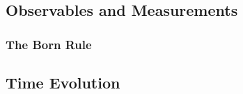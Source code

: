 


\subsection{Observables and Measurements}


\subsubsection{The Born Rule}

















\subsection{Time Evolution}

